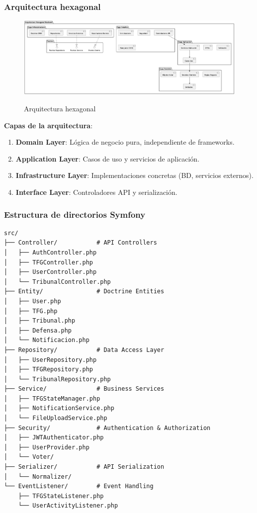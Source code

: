 \documentclass[12pt,a4paper,oneside]{report}
\providecommand{\tightlist}{%
  \setlength{\itemsep}{0pt}\setlength{\parskip}{0pt}}
\providecommand{\pandocbounded}[1]{#1}
\begin{document}
\subsubsection{Arquitectura hexagonal}\label{arquitectura-hexagonal}

\begin{figure}
\centering
\pandocbounded{\includegraphics[keepaspectratio,alt={Arquitectura hexagonal}]{processed/images/05_diseno_plantuml_1.png}}
\caption{Arquitectura hexagonal}
\end{figure}

\textbf{Capas de la arquitectura}:

\begin{enumerate}
\def\labelenumi{\arabic{enumi}.}
\tightlist
\item
  \textbf{Domain Layer}: Lógica de negocio pura, independiente de
  frameworks.
\item
  \textbf{Application Layer}: Casos de uso y servicios de aplicación.
\item
  \textbf{Infrastructure Layer}: Implementaciones concretas (BD,
  servicios externos).
\item
  \textbf{Interface Layer}: Controladores API y serialización.
\end{enumerate}

\subsubsection{Estructura de directorios
Symfony}\label{estructura-de-directorios-symfony}

\begin{lstlisting}
src/
├── Controller/           # API Controllers
│   ├── AuthController.php
│   ├── TFGController.php
│   ├── UserController.php
│   └── TribunalController.php
├── Entity/               # Doctrine Entities
│   ├── User.php
│   ├── TFG.php
│   ├── Tribunal.php
│   ├── Defensa.php
│   └── Notificacion.php
├── Repository/           # Data Access Layer
│   ├── UserRepository.php
│   ├── TFGRepository.php
│   └── TribunalRepository.php
├── Service/              # Business Services
│   ├── TFGStateManager.php
│   ├── NotificationService.php
│   └── FileUploadService.php
├── Security/             # Authentication & Authorization
│   ├── JWTAuthenticator.php
│   ├── UserProvider.php
│   └── Voter/
├── Serializer/           # API Serialization
│   └── Normalizer/
└── EventListener/        # Event Handling
    ├── TFGStateListener.php
    └── UserActivityListener.php
\end{lstlisting}
\end{document}
